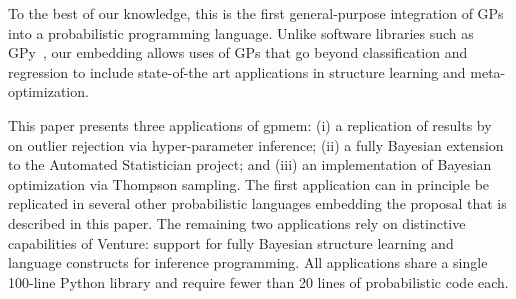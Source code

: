 To the best of our knowledge, this is the first general-purpose integration of
\acsp{GP} into a probabilistic programming language. Unlike software
libraries such as GPy~\citep{gpy2014}, our embedding allows uses of GPs that go beyond classification and regression to include state-of-the art applications in structure learning and meta-optimization.

This paper presents three applications of gpmem: (i) a replication of results
by~\citet{neal1997monte} on outlier rejection via hyper-parameter inference;
(ii) a fully Bayesian extension to the Automated Statistician project; and (iii)
an implementation of Bayesian optimization via Thompson sampling. The first
application can in principle be replicated in several other probabilistic
languages embedding the proposal that is described in this paper. The remaining
two applications rely on distinctive capabilities of Venture: support for fully
Bayesian structure learning and language constructs for inference programming.
All applications share a single 100-line Python library and require fewer than 20 lines of probabilistic code each.



